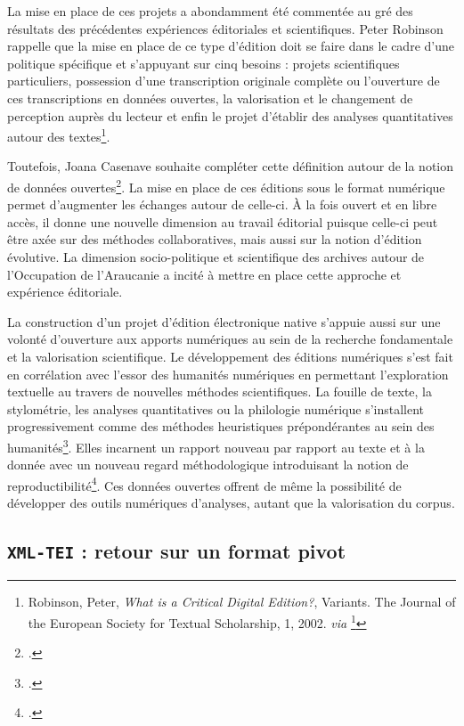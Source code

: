 	La mise en place de ces projets a abondamment été commentée au gré des résultats des précédentes expériences éditoriales et scientifiques. Peter Robinson rappelle que la mise en place de ce type d'édition doit se faire dans le cadre d'une politique spécifique et s'appuyant sur cinq besoins : projets scientifiques particuliers, possession d'une transcription originale complète ou l'ouverture de ces transcriptions en données ouvertes, la valorisation et le changement de perception auprès du lecteur et enfin le projet d'établir des analyses quantitatives autour des textes\footnote{Robinson, Peter, \textit{What is a Critical Digital Edition?}, Variants. The Journal of the European Society for Textual Scholarship, 1, 2002. \textit{via} \footcite{vertongenQuEstceQu2022}}.
	
	Toutefois, Joana Casenave souhaite compléter cette définition autour de la notion de données ouvertes\footcite{casenavePositionnementEditorialDans2019}. La mise en place de ces éditions sous le format numérique permet d'augmenter les échanges autour de celle-ci. À la fois ouvert et en libre accès, il donne une nouvelle dimension au travail éditorial puisque celle-ci peut être axée sur des méthodes collaboratives, mais aussi sur la notion d'édition évolutive. La dimension socio-politique et scientifique des archives autour de l'Occupation de l'Araucanie a incité à mettre en place cette approche et expérience éditoriale.
	
	La construction d'un projet d'édition électronique native s'appuie aussi sur une volonté d'ouverture aux apports numériques au sein de la recherche fondamentale et la valorisation scientifique. Le développement des éditions numériques s'est fait en corrélation avec l'essor des humanités numériques en permettant l'exploration textuelle au travers de nouvelles méthodes scientifiques. La fouille de texte, la stylométrie, les analyses quantitatives ou la philologie numérique s'installent progressivement comme des méthodes heuristiques prépondérantes au sein des humanités\footcite{campsOuVaPhilologie2018}. Elles incarnent un rapport nouveau par rapport au texte et à la donnée avec un nouveau regard méthodologique introduisant la notion de reproductibilité\footcite{campsOuVaPhilologie2018}. Ces données ouvertes offrent de même la possibilité de développer des outils numériques d'analyses, autant que la valorisation du corpus.
	
	\subsection{\texttt{XML-TEI} : retour sur un format pivot}
	
